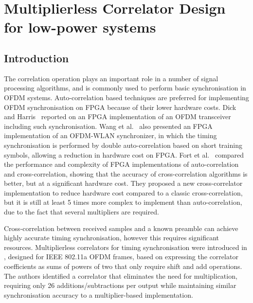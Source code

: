 \chapter{Multiplierless Correlator Design for low-power systems}
\label{chap:multiplierlesscorrelator}

\section{Introduction}
The correlation operation plays an important role in a number of signal processing algorithms, and is commonly used to perform basic synchronisation in OFDM systems.
Auto-correlation based techniques are preferred for implementing OFDM synchronisation on FPGA because of their lower hardware costs.
Dick and Harris~\cite{Dick2003} reported on an FPGA implementation of an OFDM transceiver including such synchronisation.
Wang et al.~\cite{Wang2004} also presented an FPGA implementation of an OFDM-WLAN synchronizer, in which the timing synchronisation is performed by double auto-correlation based on short training symbols, allowing a reduction in hardware cost on FPGA.
Fort et al.~\cite{Fort2003} compared the performance and complexity of FPGA implementations of auto-correlation and cross-correlation, showing that the accuracy of cross-correlation algorithms is better, but at a significant hardware cost.
They proposed a new cross-correlator implementation to reduce hardware cost compared to a classic cross-correlation, but it is still at least 5 times more complex to implement than auto-correlation, due to the fact that several multipliers are required.

Cross-correlation between received samples and a known preamble can achieve highly accurate timing synchronisation, however this requires significant resources.
Multiplierless correlators for timing synchronisation were introduced in \cite{Yip2003}, designed for IEEE 802.11a OFDM frames, based on expressing the correlator coefficients as sums of powers of two that only require shift and add operations.
The authors identified a correlator that eliminates the need for multiplication, requiring only 26 additions/subtractions per output while maintaining similar synchronisation accuracy to a multiplier-based implementation.

